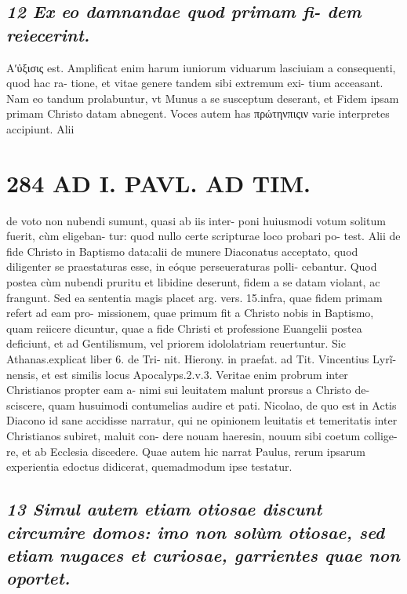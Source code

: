 \documentclass{article}
\begin{document}
\begin{pages}
\subsection*{\textit{12 Ex eo damnandae quod primam fi- dem reiecerint. }}\pstart Αʹὐξισις est. Amplificat enim harum iuniorum viduarum lasciuiam a consequenti, quod hac ra- tione, et vitae genere tandem sibi extremum exi- tium acceasant. Nam eo tandum prolabuntur, vt Munus a se susceptum deserant, et Fidem ipsam primam Christo datam abnegent. Voces autem has πρώτηνπιςιν varie interpretes accipiunt. Alii  \pend
\section*{284 AD I. PAVL. AD TIM. }
\marginpar{[ p.]}\pstart de voto non nubendi sumunt, quasi ab iis inter- poni huiusmodi votum solitum fuerit, cùm eligeban- tur: quod nullo certe scripturae loco probari po- test. Alii de fide Christo in Baptismo data:alii de munere Diaconatus acceptato, quod diligenter se praestaturas esse, in eóque perseueraturas polli- cebantur. Quod postea cùm nubendi pruritu et libidine deserunt, fidem a se datam violant, ac frangunt. Sed ea sententia magis placet arg. vers. 15.infra, quae fidem primam refert ad eam pro- missionem, quae primum fit a Christo nobis in Baptismo, quam reiicere dicuntur, quae a fide Christi et professione Euangelii postea deficiunt, et ad Gentilismum, vel priorem idololatriam reuertuntur. Sic Athanas.explicat liber 6. de Tri- nit. Hierony. in praefat. ad Tit. Vincentius Lyrĩ- nensis, et est similis locus Apocalyps.2.v.3. Veritae enim probrum inter Christianos propter eam a- nimi sui leuitatem malunt prorsus a Christo de- sciscere, quam husuimodi contumelias audire et pati. Nicolao, de quo est in Actis Diacono id sane accidisse narratur, qui ne opinionem leuitatis et temeritatis inter Christianos subiret, maluit con- dere nouam haeresin, nouum sibi coetum collige- re, et ab Ecclesia discedere.  \pend\pstart Quae autem hic narrat Paulus, rerum ipsarum experientia edoctus didicerat, quemadmodum ipse testatur.  \pend
{}
{}
\subsection*{\textit{13 Simul autem etiam otiosae discunt circumire domos: imo non solùm otiosae, sed etiam nugaces et curiosae, garrientes quae non oportet. }}

\end{pages}
\end{document}
